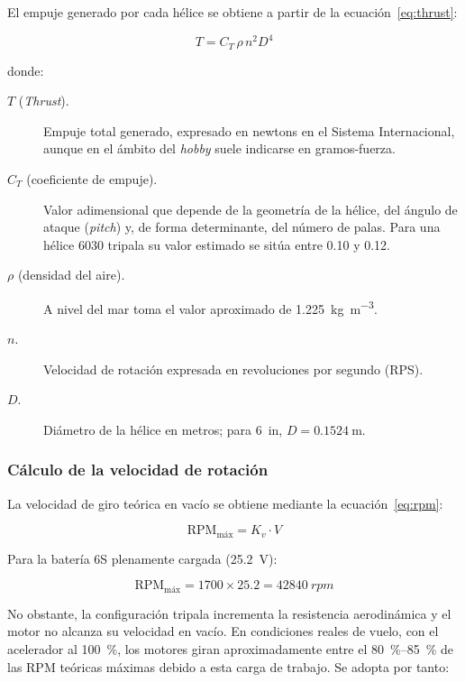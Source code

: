 \documentclass[12pt, letterpaper]{report}
\begin{document}
El empuje generado por cada hélice se obtiene a partir de la ecuación~\eqref{eq:thrust}:

\begin{equation}
T = C_T \, \rho \, n^{2} D^{4}
\label{eq:thrust}
\end{equation}

\noindent donde:

\begin{description}
  \item[$T$ (\textit{Thrust}).] Empuje total generado, expresado en newtons en 
  el Sistema Internacional, aunque en el ámbito del \textit{hobby} suele 
  indicarse en gramos-fuerza.
  \item[$C_T$ (coeficiente de empuje).] Valor adimensional que depende de la 
  geometría de la hélice, del ángulo de ataque (\textit{pitch}) y, de forma 
  determinante, del número de palas. Para una hélice 6030 tripala su valor 
  estimado se sitúa entre 0.10 y 0.12.
  \item[$\rho$ (densidad del aire).] A nivel del mar toma el valor aproximado 
  de \SI{1.225}{\kilo\gram\per\meter\cubed}.
  \item[$n$.] Velocidad de rotación expresada en revoluciones por segundo (RPS).
  \item[$D$.] Diámetro de la hélice en metros; para \SI{6}{in}, 
  $D = \SI{0.1524}{\meter}$.
\end{description}

\subsubsection{Cálculo de la velocidad de rotación}

La velocidad de giro teórica en vacío se obtiene mediante la 
ecuación~\eqref{eq:rpm}:

\begin{equation}
\text{RPM}_{\text{máx}} = K_v \cdot V
\label{eq:rpm}
\end{equation}

Para la batería 6S plenamente cargada (\SI{25.2}{\volt}):

\begin{equation}
\text{RPM}_{\text{máx}} = 1700 \times 25.2 = \SI{42840}{rpm}
\end{equation}

No obstante, la configuración tripala incrementa la resistencia aerodinámica y 
el motor no alcanza su velocidad en vacío. En condiciones reales de vuelo, con 
el acelerador al \SI{100}{\percent}, los motores giran aproximadamente entre el 
\SIrange{80}{85}{\percent} de las RPM teóricas máximas debido a esta carga de 
trabajo. Se adopta por tanto:
\end{document}

